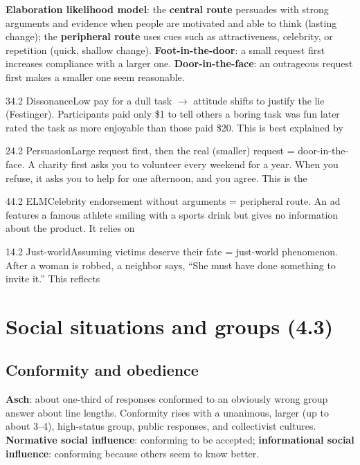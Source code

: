 \documentclass[11pt]{article}
\begin{document}
\textbf{Elaboration likelihood model}: the \textbf{central route} persuades with strong arguments and evidence when people are motivated and able to think (lasting change); the \textbf{peripheral route} uses cues such as attractiveness, celebrity, or repetition (quick, shallow change). \textbf{Foot-in-the-door}: a small request first increases compliance with a larger one. \textbf{Door-in-the-face}: an outrageous request first makes a smaller one seem reasonable.

\begin{q}{3}{4.2 Dissonance}{Low pay for a dull task \(\rightarrow\) attitude shifts to justify the lie (Festinger).}
Participants paid only \$1 to tell others a boring task was fun later rated the task as more enjoyable than those paid \$20. This is best explained by
\end{q}

\begin{q}{2}{4.2 Persuasion}{Large request first, then the real (smaller) request = door-in-the-face.}
A charity first asks you to volunteer every weekend for a year. When you refuse, it asks you to help for one afternoon, and you agree. This is the
\end{q}

\begin{q}{4}{4.2 ELM}{Celebrity endorsement without arguments = peripheral route.}
An ad features a famous athlete smiling with a sports drink but gives no information about the product. It relies on
\end{q}

\begin{q}{1}{4.2 Just-world}{Assuming victims deserve their fate = just-world phenomenon.}
After a woman is robbed, a neighbor says, ``She must have done something to invite it.'' This reflects
\end{q}

\section{Social situations and groups (4.3)}

\subsection{Conformity and obedience}
\textbf{Asch}: about one-third of responses conformed to an obviously wrong group answer about line lengths. Conformity rises with a unanimous, larger (up to about 3--4), high-status group, public responses, and collectivist cultures. \textbf{Normative social influence}: conforming to be accepted; \textbf{informational social influence}: conforming because others seem to know better.
\end{document}
